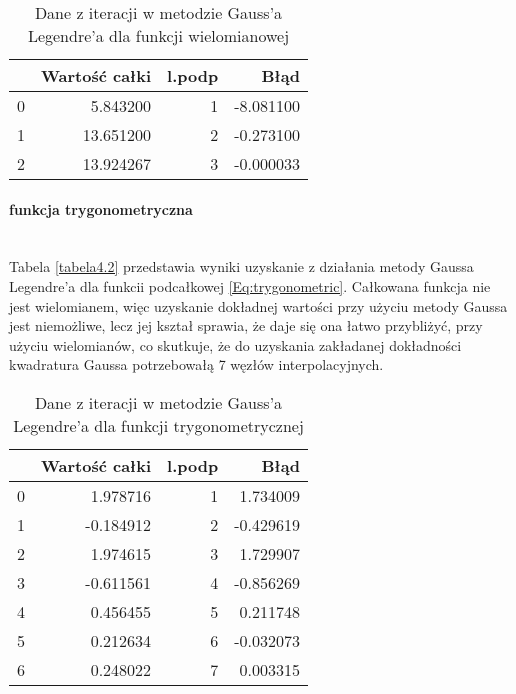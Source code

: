 \documentclass[12pt,twoside]{article}
\begin{document}
\begin{table}[H]
\centering 
\caption{Dane z iteracji w metodzie Gauss'a Legendre'a dla funkcji wielomianowej}
\label{tabela4.1}
\begin{tabular}{lrrr}
\toprule
{} &  Wartość całki &  l.podp &      Błąd \\
\midrule
0 &       5.843200 &       1 & -8.081100 \\
1 &      13.651200 &       2 & -0.273100 \\
2 &      13.924267 &       3 & -0.000033 \\
\bottomrule
\end{tabular}
\end{table}

\paragraph{funkcja trygonometryczna}\mbox{} \\

Tabela \eqref{tabela4.2} przedstawia wyniki uzyskanie z działania metody Gaussa Legendre'a dla funkcii podcałkowej \eqref{Eq:trygonometric}. Całkowana funkcja nie jest wielomianem, więc uzyskanie dokładnej wartości przy użyciu metody Gaussa jest niemożliwe, lecz jej kształ sprawia, że daje się ona łatwo przybliżyć, przy użyciu wielomianów, co skutkuje, że do uzyskania zakładanej dokładności kwadratura Gaussa potrzebowałą 7 węzłów interpolacyjnych.

\begin{table}[H]
\centering
\caption{Dane z iteracji w metodzie Gauss'a Legendre'a dla funkcji trygonometrycznej}
\label{tabela4.2}
\begin{tabular}{lrrr}
\toprule
{} &  Wartość całki &  l.podp &      Błąd \\
\midrule
0 &       1.978716 &       1 &  1.734009 \\
1 &      -0.184912 &       2 & -0.429619 \\
2 &       1.974615 &       3 &  1.729907 \\
3 &      -0.611561 &       4 & -0.856269 \\
4 &       0.456455 &       5 &  0.211748 \\
5 &       0.212634 &       6 & -0.032073 \\
6 &       0.248022 &       7 &  0.003315 \\
\bottomrule
\end{tabular}
\end{table}
\end{document}
